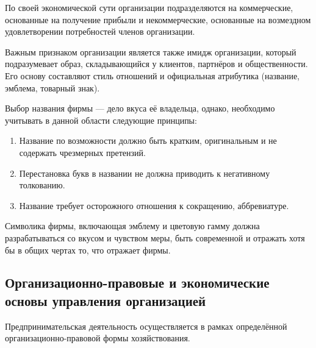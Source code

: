 \documentclass[12pt, russian, oneside, article]{ncc}
\begin{document}
По своей экономической сути организации подразделяются на коммерческие, основанные на получение прибыли и некоммерческие, основанные на возмездном удовлетворении потребностей членов организации.

Важным признаком организации является также имидж организации, который подразумевает образ, складывающийся у клиентов, партнёров и общественности. Его основу составляют стиль отношений и официальная атрибутика (название, эмблема, товарный знак).

Выбор названия фирмы --- дело вкуса её владельца, однако, необходимо учитывать в данной области следующие принципы:
\begin{enumerate}
\item Название по возможности должно быть кратким, оригинальным и не содержать чрезмерных претензий.
\item Перестановка букв в названии не должна приводить к негативному толкованию.
\item Название требует осторожного отношения к сокращению, аббревиатуре.
\end{enumerate}

Символика фирмы, включающая эмблему и цветовую гамму должна разрабатываться со вкусом и чувством меры, быть современной и отражать хотя бы в общих чертах то, что отражает фирмы.
\subsection{Организационно-правовые и экономические основы управления организацией}
\label{sec-5_4}


Предпринимательская деятельность осуществляется в рамках определённой организационно-правовой формы хозяйствования.
\end{document}
